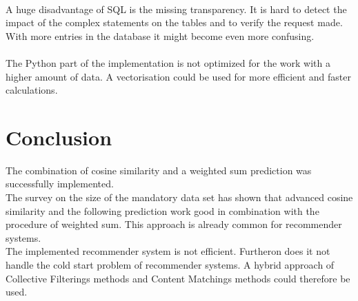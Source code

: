 \documentclass[a4paper,12pt,twoside]{article}
\begin{document}
\\
A huge disadvantage of SQL is the missing transparency. It is hard to detect the impact of the complex statements on the tables and to verify the request made. With more entries in the database it might become even more confusing.\\
\\
The Python part of the implementation is not optimized for the work with a higher amount of data. A vectorisation could be used for more efficient and faster calculations. 

\section{Conclusion}
The combination of cosine similarity and a weighted sum prediction was successfully implemented. \\
The survey on the size of the mandatory data set has shown that advanced cosine similarity and the following prediction work good in combination with the procedure of weighted sum. This approach is already common for recommender systems.\\
The implemented recommender system is not efficient. Furtheron does it not handle the cold start problem of recommender systems. A hybrid approach of Collective Filterings methods and Content Matchings methods could therefore be used.\\ 



 
\end{document}
